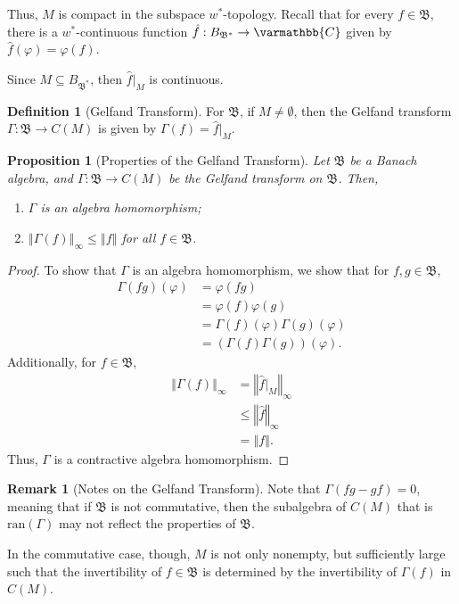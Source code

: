\documentclass[12pt]{extarticle}
\newcommand{\C}{\mathbb{C}}
\newcommand{\norm}[1]{\left\Vert #1\right\Vert}
\theoremstyle{plain}
\newtheorem*{proposition}{Proposition}
\theoremstyle{definition}
\newtheorem*{definition}{Definition}
\theoremstyle{note}
\newtheorem*{remark}{Remark}
\renewcommand*{\mathbb}[1]{\varmathbb{#1}}
\renewcommand{\newline}{\hfill\break}
\begin{document}
Thus, $M$ is compact in the subspace $w^{\ast}$-topology. Recall that for every $f\in \mathfrak{B}$, there is a $w^{\ast}$-continuous function $\hat{f}: B_{\mathfrak{B}^{\ast}}\rightarrow \C$ given by $\hat{f}(\varphi) = \varphi(f)$.\newline

Since $M\subseteq B_{\mathfrak{B}^{\ast}}$, then $\hat{f}|_{M}$ is continuous.
\begin{definition}[Gelfand Transform]
  For $\mathfrak{B}$, if $M\neq \emptyset$, then the Gelfand transform $\Gamma: \mathfrak{B}\rightarrow C(M)$ is given by $\Gamma(f) = \hat{f}|_{M}$.
\end{definition}
\begin{proposition}[Properties of the Gelfand Transform]
  Let $\mathfrak{B}$ be a Banach algebra, and $\Gamma: \mathfrak{B}\rightarrow C(M)$ be the Gelfand transform on $\mathfrak{B}$. Then,
  \begin{enumerate}[(1)]
    \item $\Gamma$ is an algebra homomorphism;
    \item $\norm{\Gamma(f)}_{\infty} \leq \norm{f}$ for all $f\in \mathfrak{B}$.
  \end{enumerate}
\end{proposition}
\begin{proof}
  To show that $\Gamma$ is an algebra homomorphism, we show that for $f,g\in \mathfrak{B}$,
  \begin{align*}
    \Gamma(fg)(\varphi) &= \varphi(fg) \\
                        &= \varphi(f)\varphi(g)\\
                        &= \Gamma(f)(\varphi)\Gamma(g)(\varphi)\\
                        &= \left(\Gamma(f)\Gamma(g)\right)(\varphi).
  \end{align*}
  Additionally, for $f\in \mathfrak{B}$,
  \begin{align*}
    \norm{\Gamma(f)}_{\infty} &= \norm{\hat{f}|_{M}}_{\infty}\\
                              &\leq \norm{\hat{f}}_{\infty}\\
                              &= \norm{f}.
  \end{align*}
  Thus, $\Gamma$ is a contractive algebra homomorphism.
\end{proof}
\begin{remark}[Notes on the Gelfand Transform]
  Note that $\Gamma(fg - gf) = 0$, meaning that if $\mathfrak{B}$ is not commutative, then the subalgebra of $C(M)$ that is $\text{ran}\left(\Gamma\right)$ may not reflect the properties of $\mathfrak{B}$.\newline

  In the commutative case, though, $M$ is not only nonempty, but sufficiently large such that the invertibility of $f\in \mathfrak{B}$ is determined by the invertibility of $\Gamma(f)$ in $C(M)$.
\end{remark}
\end{document}
